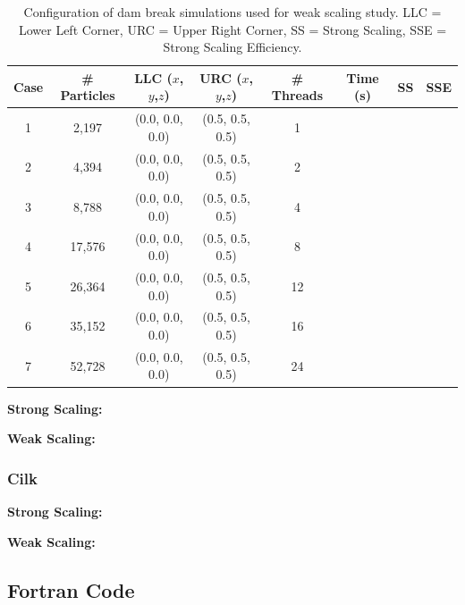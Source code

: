 \documentclass{scrartcl}
\begin{document}
    \begin{table}
    	\begin{tabular}{| c | c | c | c | c | c | c | c |}
    		\hline
    		Case & \# Particles & LLC ($x$,$y$,$z$) & URC ($x$,$y$,$z$) & \# Threads & Time (s) & SS& SSE \\ \hline
    		1 & 2,197 & (0.0, 0.0, 0.0) & (0.5, 0.5, 0.5) & 1 & & & \\ \hline		  		
    		2 & 4,394 & (0.0, 0.0, 0.0) & (0.5, 0.5, 0.5) & 2 & & & \\ \hline		  		
    		3 & 8,788 & (0.0, 0.0, 0.0) & (0.5, 0.5, 0.5) & 4 & & & \\ \hline		  		
    		4 & 17,576 & (0.0, 0.0, 0.0) & (0.5, 0.5, 0.5) & 8 & & & \\ \hline		  		
    		5 & 26,364 & (0.0, 0.0, 0.0) & (0.5, 0.5, 0.5) & 12 & & & \\ \hline		  		
    		6 & 35,152 & (0.0, 0.0, 0.0) & (0.5, 0.5, 0.5) & 16 & & & \\ \hline		  		
    		7 & 52,728 & (0.0, 0.0, 0.0) & (0.5, 0.5, 0.5) & 24 & & & \\ \hline		  		
    	\end{tabular}
    	\caption{Configuration of dam break simulations used for weak scaling study. LLC = Lower Left Corner, URC = Upper Right Corner, SS = Strong Scaling, SSE = Strong Scaling Efficiency.}
    	\label{tab:ws}
    \end{table}
  
    \textbf{Strong Scaling:}
    
    \textbf{Weak Scaling:}
    
  \subsubsection{Cilk}
  \textbf{Strong Scaling:}
  
  \textbf{Weak Scaling:}
  \subsection{Fortran Code}    
  
\end{document}
